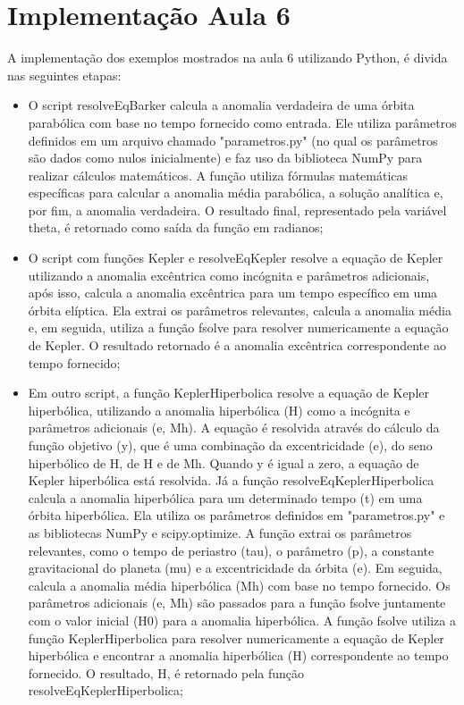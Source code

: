 \section{Implementação Aula 6}

A implementação dos exemplos mostrados na aula 6 utilizando Python, é divida nas seguintes etapas:

\begin{itemize}
    \item O script resolveEqBarker calcula a anomalia verdadeira de uma órbita parabólica com base no tempo fornecido como entrada. Ele utiliza parâmetros definidos em um arquivo chamado "parametros.py" (no qual os parâmetros são dados como nulos inicialmente) e faz uso da biblioteca NumPy para realizar cálculos matemáticos. A função utiliza fórmulas matemáticas específicas para calcular a anomalia média parabólica, a solução analítica e, por fim, a anomalia verdadeira. O resultado final, representado pela variável theta, é retornado como saída da função em radianos;
    \item O script com funções Kepler e resolveEqKepler resolve a equação de Kepler utilizando a anomalia excêntrica como incógnita e parâmetros adicionais, após isso, calcula a anomalia excêntrica para um tempo específico em uma órbita elíptica. Ela extrai os parâmetros relevantes, calcula a anomalia média e, em seguida, utiliza a função fsolve para resolver numericamente a equação de Kepler. O resultado retornado é a anomalia excêntrica correspondente ao tempo fornecido;
    \item Em outro script, a função KeplerHiperbolica resolve a equação de Kepler hiperbólica, utilizando a anomalia hiperbólica (H) como a incógnita e parâmetros adicionais (e, Mh). A equação é resolvida através do cálculo da função objetivo (y), que é uma combinação da excentricidade (e), do seno hiperbólico de H, de H e de Mh. Quando y é igual a zero, a equação de Kepler hiperbólica está resolvida. Já a função resolveEqKeplerHiperbolica calcula a anomalia hiperbólica para um determinado tempo (t) em uma órbita hiperbólica. Ela utiliza os parâmetros definidos em "parametros.py" e as bibliotecas NumPy e scipy.optimize. A função extrai os parâmetros relevantes, como o tempo de periastro (tau), o parâmetro (p), a constante gravitacional do planeta (mu) e a excentricidade da órbita (e). Em seguida, calcula a anomalia média hiperbólica (Mh) com base no tempo fornecido. Os parâmetros adicionais (e, Mh) são passados para a função fsolve juntamente com o valor inicial (H0) para a anomalia hiperbólica. A função fsolve utiliza a função KeplerHiperbolica para resolver numericamente a equação de Kepler hiperbólica e encontrar a anomalia hiperbólica (H) correspondente ao tempo fornecido. O resultado, H, é retornado pela função resolveEqKeplerHiperbolica; 

\end{itemize}
